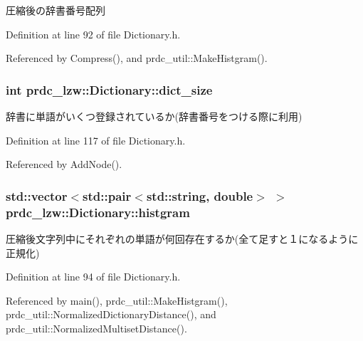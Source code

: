 圧縮後の辞書番号配列 



Definition at line 92 of file Dictionary.\-h.



Referenced by Compress(), and prdc\-\_\-util\-::\-Make\-Histgram().

\hypertarget{classprdc__lzw_1_1Dictionary_ac96b4db6d4692ba9b082fe32e54bcf0d}{
\subsubsection[{dict\-\_\-size}]{\setlength{\rightskip}{0pt plus 5cm}int prdc\-\_\-lzw\-::\-Dictionary\-::dict\-\_\-size\hspace{0.3cm}{\ttfamily [private]}}}\label{classprdc__lzw_1_1Dictionary_ac96b4db6d4692ba9b082fe32e54bcf0d}


辞書に単語がいくつ登録されているか(辞書番号をつける際に利用) 



Definition at line 117 of file Dictionary.\-h.



Referenced by Add\-Node().

\hypertarget{classprdc__lzw_1_1Dictionary_a10f2b395d4021c26d500bf328c7839ac}{
\subsubsection[{histgram}]{\setlength{\rightskip}{0pt plus 5cm}std\-::vector$<$std\-::pair$<$std\-::string, double$>$ $>$ prdc\-\_\-lzw\-::\-Dictionary\-::histgram}}\label{classprdc__lzw_1_1Dictionary_a10f2b395d4021c26d500bf328c7839ac}


圧縮後文字列中にそれぞれの単語が何回存在するか(全て足すと１になるように正規化) 



Definition at line 94 of file Dictionary.\-h.



Referenced by main(), prdc\-\_\-util\-::\-Make\-Histgram(), prdc\-\_\-util\-::\-Normalized\-Dictionary\-Distance(), and prdc\-\_\-util\-::\-Normalized\-Multiset\-Distance().

